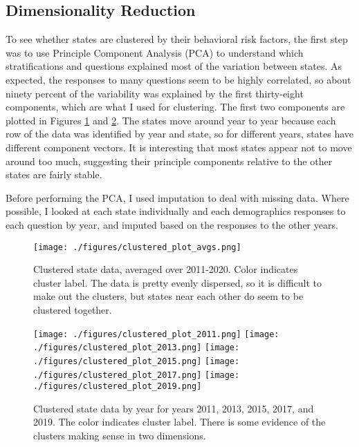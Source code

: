 \documentclass[11pt]{article}
\begin{document}
\subsection{Dimensionality Reduction}
To see whether states are clustered by their behavioral risk factors, the first step was to use Principle Component Analysis (PCA) to understand which stratifications and questions explained most of the variation between states. As expected, the responses to many questions seem to be highly correlated, so about ninety percent of the variability was explained by the first thirty-eight components, which are what I used for clustering. The first two components are plotted in Figures \ref{fig:clustered_avgs} and \ref{fig:clustered_data}. The states move around year to year because each row of the data was identified by year and state, so for different years, states have different component vectors. It is interesting that most states appear not to move around too much, suggesting their principle components relative to the other states are fairly stable.

Before performing the PCA, I used imputation to deal with missing data. Where possible, I looked at each state individually and each demographics responses to each question by year, and imputed based on the responses to the other years.


\begin{figure}[htbp]
\centering
\texttt{[image: ./figures/clustered\_plot\_avgs.png]}
\caption{
  Clustered state data, averaged over 2011-2020. Color indicates cluster label. The data is pretty evenly dispersed, so it is difficult to make out the clusters, but states near each other do seem to be clustered together.
}
\label{fig:clustered_avgs}
\end{figure}

\begin{figure}[hp]
\texttt{[image: ./figures/clustered\_plot\_2011.png]}
\texttt{[image: ./figures/clustered\_plot\_2013.png]}
\texttt{[image: ./figures/clustered\_plot\_2015.png]}
\texttt{[image: ./figures/clustered\_plot\_2017.png]}
\texttt{[image: ./figures/clustered\_plot\_2019.png]}
\caption{
  Clustered state data by year for years 2011, 2013, 2015, 2017, and 2019. The color indicates cluster label. There is some evidence of the clusters making sense in two dimensions.
}
\label{fig:clustered_data}
\end{figure}
\end{document}
